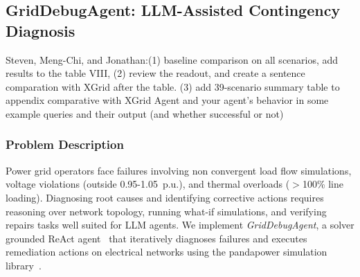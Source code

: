\documentclass[journal,onecolumn]{IEEEtran} %
\newcommand{\todo}[1]{\color{red}#1\color{black}}
\begin{document}
\clearpage
\subsection{GridDebugAgent: LLM-Assisted Contingency Diagnosis}
\label{sec:griddebug}

\todo{Steven, Meng-Chi, and Jonathan:(1) baseline comparison on all scenarios, add results to the table VIII, (2) review the readout, and create a sentence comparation with XGrid after the table. (3) add 39-scenario summary table to appendix comparative with XGrid Agent and your agent's behavior in some example queries and their output (and whether successful or not)}


\subsubsection*{\textbf{Problem Description}}
Power grid operators face failures involving non convergent load flow simulations, voltage violations (outside 0.95-1.05~p.u.), and thermal overloads ($>$100\% line loading). Diagnosing root causes and identifying corrective actions requires reasoning over network topology, running what-if simulations, and verifying repairs tasks well suited for LLM agents. We implement \textit{GridDebugAgent}, a solver grounded ReAct agent~\cite{yao2023react} that iteratively diagnoses failures and executes remediation actions on electrical networks using the pandapower simulation library~\cite{thurner2018pandapower}.
\end{document}
